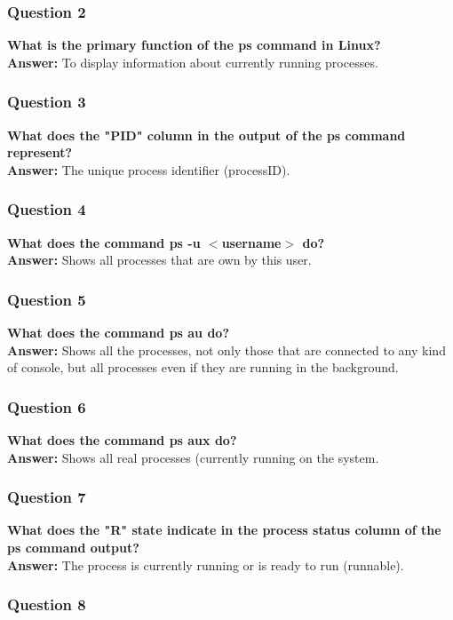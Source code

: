 \documentclass{article}
\begin{document}
\subsubsection*{Question 2}
\textbf{What is the primary function of the ps command in Linux?} \\
\textbf{Answer:} To display information about currently running processes.

\subsubsection*{Question 3}
\textbf{What does the "PID" column in the output of the ps command represent?} \\
\textbf{Answer:} The unique process identifier (processID). 

\subsubsection*{Question 4}
\textbf{What does the command ps -u $<$username$>$ do?} \\
\textbf{Answer:} Shows all processes that are own by this user.

\subsubsection*{Question 5}
\textbf{What does the command ps au do?} \\
\textbf{Answer:} Shows all the processes, not only those that are connected to any kind of console, but all processes even if they are running in the background.

\subsubsection*{Question 6}
\textbf{What does the command ps aux do?} \\
\textbf{Answer:} Shows all real processes (currently running on the system.

\subsubsection*{Question 7}
\textbf{What does the "R" state indicate in the process status column of the ps command output?} \\
\textbf{Answer:} The process is currently running or is ready to run (runnable).

\subsubsection*{Question 8}
\end{document}
